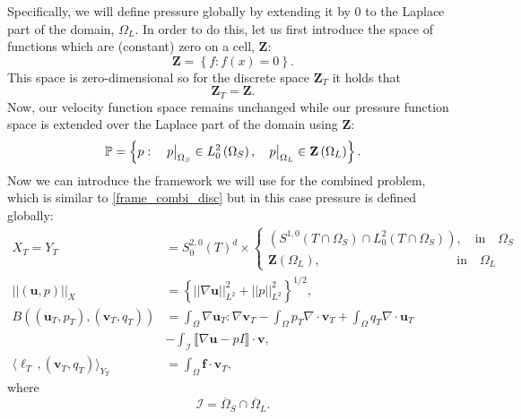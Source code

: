 \documentclass[12pt,a4paper]{article}
\theoremstyle{definition}
\newcommand\restr[2]{{%
		\left.\kern-\nulldelimiterspace %
		#1 %
		\vphantom{\big|} %
		\right|_{#2} %
}}
\begin{document}
Specifically, we will define pressure globally by extending it by $0$ to the Laplace part of the domain, $\Omega_L$.  In order to do this, let us first introduce the space of functions which are (constant) zero on a cell, $\textbf{Z}$:
\begin{equation}
\textbf{Z}=\left\lbrace  f: f\left(x\right)=0 \right\rbrace.
\end{equation}
 This space is zero-dimensional so for the discrete space $\textbf{Z}_T$ it holds that
\begin{equation}
\textbf{Z}_T=\textbf{Z}.\nonumber 
\end{equation}
 Now, our velocity function space remains unchanged while our pressure function space is extended over the Laplace part of the domain using $\textbf{Z}$:
\begin{equation}\label{extended_pressure_space}
\mathbb{P}=\left\lbrace p: \quad \restr{p}{{\Omega_S}}\in L^2_0\left(\Omega_S\right),\quad  \restr{p}{{\Omega_L}}\in\textbf{Z}\left(\Omega_L\right)\right\rbrace.
\end{equation}
Now we can introduce the framework we will use for the combined problem, which is similar to \ref{frame_combi_disc} but in this case pressure is defined globally:
\begin{equation}
\begin{aligned}
X_T=Y_T&=S_0^{2,0}\left(T\right)^d\times \begin{cases}
\left(S^{1,0}\left(T\cap\Omega_S\right)\cap L^2_0\left(T\cap\Omega_S\right)\right),\quad\text{in}\quad\Omega_S\\
\textbf{Z}\left(\Omega_L\right),\quad\quad\quad\quad\quad\quad\quad\quad\quad\quad\,\,\,\,\,\text{in}\quad\Omega_L
\end{cases}\\
\left|\left|\left(\textbf{u},p\right)\right|\right|_X&=\left\lbrace \left|\left|\nabla\textbf{u}\right|\right|^2_{L^2} + \left|\left|p\right|\right|^2_{L^2}\right\rbrace^{1/2},\\
B\left(\left(\textbf{u}_T,p_T\right),\left(\textbf{v}_T,q_T\right)\right)&=\int_{\Omega}\nabla \textbf{u}_T : \nabla \textbf{v}_T - \int_{\Omega} p_T \nabla\cdot\textbf{v}_T + \int_{\Omega} q_T \nabla\cdot\textbf{u}_T\\&-\int_{\mathcal{I}} \llbracket\nabla\textbf{u}-pI\rrbracket\cdot\textbf{v},\\
\langle \ell_T\,,\left(\textbf{v}_T,q_T\right) \rangle_{Y_T} &= \int_{\Omega}\textbf{f}\cdot \textbf{v}_T,
\end{aligned}
\end{equation}
where 
\begin{equation}
\mathcal{I}=\overline{\Omega}_S\cap\overline{\Omega}_L.
\end{equation}
\end{document}
